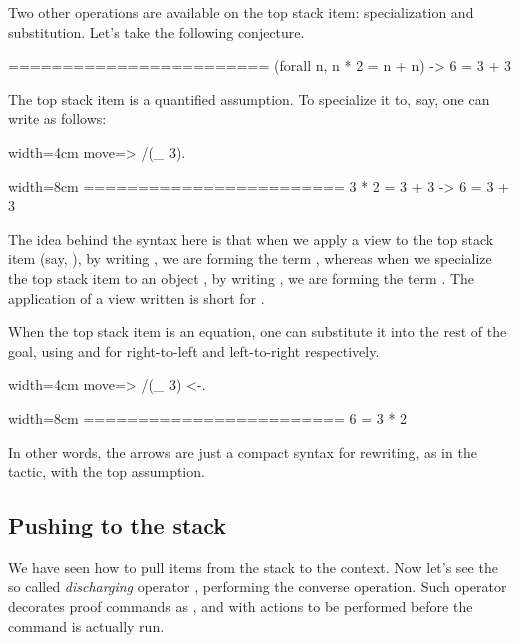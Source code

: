 Two other operations are available on the top stack item: specialization
and substitution.  Let's take the following conjecture.

\begin{coqout}{}{}
========================
(forall n, n * 2 = n + n) -> 6 = 3 + 3
\end{coqout}

The top stack item is a quantified assumption.  To specialize it to, say,
 one can write as follows:

\begin{coq-left}{}{width=4cm}
move=> /(_ 3).
$~$
\end{coq-left}
\begin{coqout-right}{}{width=8cm}
========================
3 * 2 = 3 + 3 -> 6 = 3 + 3
\end{coqout-right}

The idea behind the syntax here is that when we apply a view  to
the top stack item (say, ), by writing , we are
forming the term , whereas
when we specialize the top stack item  to an object ,
by writing , we are forming the term .
The application of a view written  is short for .

When the top stack item is an equation, one can substitute it into
the rest of the goal, using \C{<-} and \C{->} for
right-to-left and left-to-right respectively.

\begin{coq-left}{}{width=4cm}
move=> /(_ 3) <-.
$~$
\end{coq-left}
\begin{coqout-right}{}{width=8cm}
========================
6 = 3 * 2
\end{coqout-right}

In other words, the arrows are just a compact syntax for rewriting,
as in the  tactic, with the top assumption.

\subsection{Pushing to the stack}

We have seen how to pull items from the stack to the context.
Now let's see the so called \emph{discharging} operator \C{:}, performing
the converse operation.
Such operator decorates
proof commands as ,  and 
 with actions to be performed before the command is actually run.

